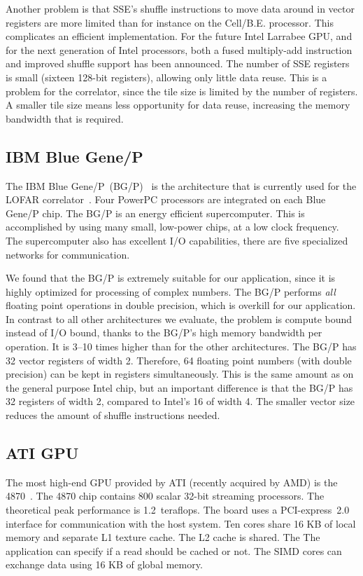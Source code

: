 \documentclass{article}
\begin{document}
Another problem is that SSE's shuffle instructions to move data around
in vector registers are more limited than for instance on the
\mbox{Cell/B.E.} processor. This complicates an efficient
implementation.  For the future Intel Larrabee GPU, and for the next
generation of Intel processors, both a fused multiply-add instruction
and improved shuffle support has been announced.  The number of SSE
registers is small (sixteen 128-bit registers), allowing only little
data reuse.  This is a problem for the correlator, since the tile size
is limited by the number of registers.  A smaller tile size means less
opportunity for data reuse, increasing the memory bandwidth that is
required.


\subsection{IBM Blue Gene/P}

The IBM Blue Gene/P~(BG/P)~\cite{bgp} is the architecture that is
currently used for the LOFAR correlator~\cite{sc09}.  Four PowerPC
processors are integrated on each Blue Gene/P chip.  The BG/P is an
energy efficient supercomputer. This is accomplished by using many
small, low-power chips, at a low clock frequency.  The supercomputer
also has excellent I/O capabilities, there are five specialized
networks for communication.

We found that the BG/P is extremely suitable for our application,
since it is highly optimized for processing of complex numbers.  The
BG/P performs \emph{all} floating point operations in double
precision, which is overkill for our application.  In contrast to all
other architectures we evaluate, the problem is compute bound instead
of I/O bound, thanks to the BG/P's high memory bandwidth per
operation. It is 3--10 times higher than for the other architectures.
The BG/P has 32 vector registers of width 2.  Therefore, 64 floating
point numbers (with double precision) can be kept in registers
simultaneously. This is the same amount as on the general purpose
Intel chip, but an important difference is that the BG/P has 32
registers of width 2, compared to Intel's 16 of width 4.  The smaller
vector size reduces the amount of shuffle instructions needed.


\subsection{ATI GPU}

The most high-end GPU provided by ATI (recently acquired by AMD) is
the 4870~\cite{amd-manual}.  The 4870 chip contains 800 scalar 32-bit
streaming processors.  The theoretical peak performance is
1.2~teraflops. The board uses a PCI-express~2.0 interface
for communication with the host system.  Ten cores
share 16 KB of local memory and separate L1 texture cache.  The L2
cache is shared. The The application can specify if a read should be
cached or not.  The SIMD cores can exchange data using 16 KB of global
memory.
\end{document}

